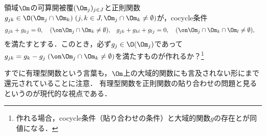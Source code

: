 \documentclass[uplatex, dvipdfmx]{jsreport}
\begin{document}
\begin{problem}[Cousin I]\label{problem-Cousin-I}
    領域$\Om$の可算開被覆$(\Om_j)_{j\in J}$と正則関数$g_{jk}\in\O(\Om_j\cap\Om_k)\;(j,k\in J,\Om_j\cap\Om_k\ne\emptyset)$が，cocycle条件
    \begin{align*}
        g_{jk}+g_{kj}&=0,\quad(\on\Om_j\cap\Om_k\ne\emptyset),&g_{jk}+g_{kl}+g_{lj}&=0,\quad(\on\Om_j\cap\Om_k\cap\Om_l\ne\emptyset),
    \end{align*}
    を満たすとする．このとき，必ず$g_j\in\O(\Om_j)$であって$g_{jk}=g_k-g_j\;(\on\Om_j\cap\Om_k\ne\emptyset)$を満たすものが作れるか？\footnote{作れる場合，cocycle条件（貼り合わせの条件）と大域的関数$g$の存在とが同値になる．}
\end{problem}
\begin{remark}[有理型関数は正則関数の貼り合わせ]
    すでに有理型関数という言葉も，$\Om$上の大域的関数にも言及されない形にまで還元されていることに注意．
    有理型関数を正則関数の貼り合わせの問題と見るというのが現代的な視点である．
\end{remark}
\end{document}
